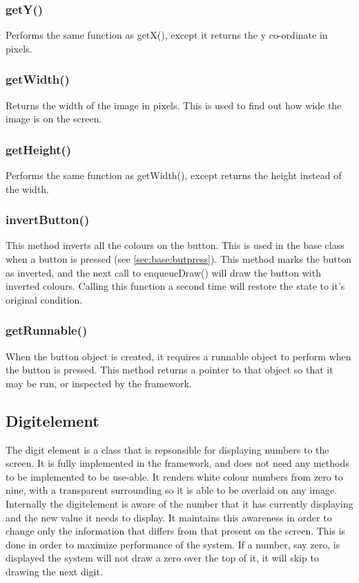 \subsubsection{getY()}

Performs the same function as getX(), except it returns the y co-ordinate in pixels.

\subsubsection{getWidth()}

Returns the width of the image in pixels. This is used to find out how wide the image is on the screen.

\subsubsection{getHeight()}

Performs the same function as getWidth(), except returns the height instead of the width.

\subsubsection{invertButton()}

This method inverts all the colours on the button. This is used in the base class when a button is pressed (see \ref{sec:base:butpress}). This method marks the button as inverted, and the next call to enqueueDraw() will draw the button with inverted colours. Calling this function a second time will restore the state to it's original condition.

\subsubsection{getRunnable()}

When the button object is created, it requires a runnable object to perform when the button is pressed. This method returns a pointer to that object so that it may be run, or inspected by the framework.

\subsection{Digitelement}

The digit element is a class that is repsonsible for displaying numbers to the screen. It is fully implemented in the framework, and does not need any methods to be implemented to be use-able. It renders white colour numbers from zero to nine, with a transparent surrounding so it is able to be overlaid on any image. Internally the digitelement is aware of the number that it has currently displaying and the new value it needs to display. It maintains this awareness in order to change only the information that differs from that present on the screen. This is done in order to maximize performance of the system. If a number, say zero, is displayed the system will not draw a zero over the top of it, it will skip to drawing the next digit.

